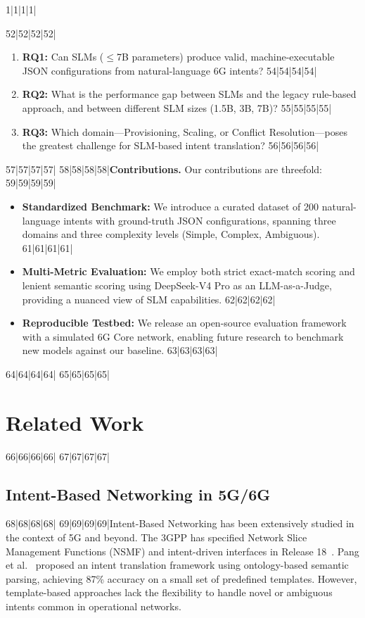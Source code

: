 1|1|1|1|\documentclass[10pt,conference]{IEEEtran}
\begin{document}
52|52|52|52|\begin{enumerate}
53|53|53|53|    \item \textbf{RQ1:} Can SLMs ($\leq$7B parameters) produce valid, machine-executable JSON configurations from natural-language 6G intents?
54|54|54|54|    \item \textbf{RQ2:} What is the performance gap between SLMs and the legacy rule-based approach, and between different SLM sizes (1.5B, 3B, 7B)?
55|55|55|55|    \item \textbf{RQ3:} Which domain---Provisioning, Scaling, or Conflict Resolution---poses the greatest challenge for SLM-based intent translation?
56|56|56|56|\end{enumerate}
57|57|57|57|
58|58|58|58|\textbf{Contributions.} Our contributions are threefold:
59|59|59|59|\begin{itemize}
60|60|60|60|    \item \textbf{Standardized Benchmark:} We introduce a curated dataset of 200 natural-language intents with ground-truth JSON configurations, spanning three domains and three complexity levels (Simple, Complex, Ambiguous).
61|61|61|61|    \item \textbf{Multi-Metric Evaluation:} We employ both strict exact-match scoring and lenient semantic scoring using DeepSeek-V4 Pro as an LLM-as-a-Judge, providing a nuanced view of SLM capabilities.
62|62|62|62|    \item \textbf{Reproducible Testbed:} We release an open-source evaluation framework with a simulated 6G Core network, enabling future research to benchmark new models against our baseline.
63|63|63|63|\end{itemize}
64|64|64|64|
65|65|65|65|\section{Related Work}
66|66|66|66|
67|67|67|67|\subsection{Intent-Based Networking in 5G/6G}
68|68|68|68|
69|69|69|69|Intent-Based Networking has been extensively studied in the context of 5G and beyond. The 3GPP has specified Network Slice Management Functions (NSMF) and intent-driven interfaces in Release 18~\cite{3gpp_r18}. Pang et al.~\cite{pang2023} proposed an intent translation framework using ontology-based semantic parsing, achieving 87\% accuracy on a small set of predefined templates. However, template-based approaches lack the flexibility to handle novel or ambiguous intents common in operational networks.
\end{document}
